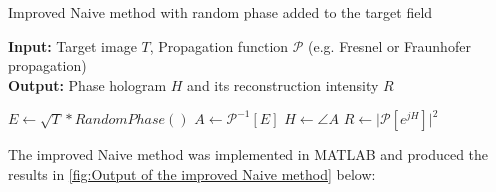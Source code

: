 \begin{algorithm}[H]
  \caption{Improved Naive method with random phase added to the target field}\label{alg:Naive algorithm with random phase}
  \textbf{Input:} Target image $T$, Propagation function $\mathcal{P}$ (e.g. Fresnel or Fraunhofer propagation)\\
  \textbf{Output:} Phase hologram $H$ and its reconstruction intensity $R$
  \begin{algorithmic}
    \State $E \gets \sqrt{T} * RandomPhase()$
    \State $A \gets \mathcal{P}^{-1}[E]$
    \State $H \gets \angle A$
    \State $R \gets \vert \mathcal{P}[e^{jH}] \vert ^2 $
  \end{algorithmic}
\end{algorithm}

The improved Naive method was implemented in MATLAB and produced the results in \cref{fig:Output of the improved Naive method} below:


